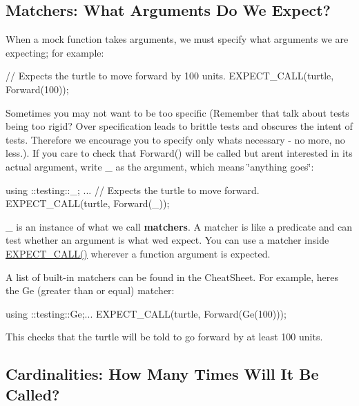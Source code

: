 \subsection*{Matchers\+: What Arguments Do We Expect?}

When a mock function takes arguments, we must specify what arguments we are expecting; for example\+:


\begin{DoxyCode}
// Expects the turtle to move forward by 100 units.
EXPECT\_CALL(turtle, Forward(100));
\end{DoxyCode}


Sometimes you may not want to be too specific (Remember that talk about tests being too rigid? Over specification leads to brittle tests and obscures the intent of tests. Therefore we encourage you to specify only what\textquotesingle{}s necessary -\/ no more, no less.). If you care to check that {\ttfamily Forward()} will be called but aren\textquotesingle{}t interested in its actual argument, write {\ttfamily \+\_\+} as the argument, which means \char`\"{}anything goes\char`\"{}\+:


\begin{DoxyCode}
using ::testing::\_;
...
// Expects the turtle to move forward.
EXPECT\_CALL(turtle, Forward(\_));
\end{DoxyCode}


{\ttfamily \+\_\+} is an instance of what we call {\bfseries matchers}. A matcher is like a predicate and can test whether an argument is what we\textquotesingle{}d expect. You can use a matcher inside {\ttfamily \hyperlink{gmock-spec-builders_8h_a535a6156de72c1a2e25a127e38ee5232}{E\+X\+P\+E\+C\+T\+\_\+\+C\+A\+L\+L()}} wherever a function argument is expected.

A list of built-\/in matchers can be found in the Cheat\+Sheet. For example, here\textquotesingle{}s the {\ttfamily Ge} (greater than or equal) matcher\+:


\begin{DoxyCode}
using ::testing::Ge;...
EXPECT\_CALL(turtle, Forward(Ge(100)));
\end{DoxyCode}


This checks that the turtle will be told to go forward by at least 100 units.

\subsection*{Cardinalities\+: How Many Times Will It Be Called?}

